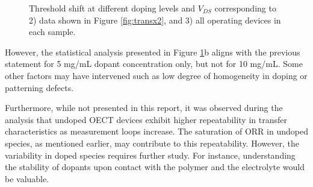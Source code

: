 \begin{figure}[ht]
  \centering
  
  \caption[Threshold shift at different doping levels and $V_{DS}$]{Threshold shift at different doping levels and $V_{DS}$ corresponding to 2) data shown in Figure \ref{fig:transx2}, and 3) all operating devices in each sample.}
  \label{fig:vth_vds}
\end{figure}

However, the statistical analysis presented in Figure \ref{fig:vth_vds}b aligns with the previous statement for 5 mg/mL dopant concentration only, but not for 10 mg/mL. Some other factors may have intervened such as low degree of homogeneity in doping or patterning defects.

Furthermore, while not presented in this report, it was observed during the analysis that undoped OECT devices exhibit higher repeatability in transfer characteristics as measurement loops increase. The saturation of ORR in undoped species, as mentioned earlier, may contribute to this repeatability. However, the variability in doped species requires further study. For instance, understanding the stability of dopants upon contact with the polymer and the electrolyte would be valuable. %

